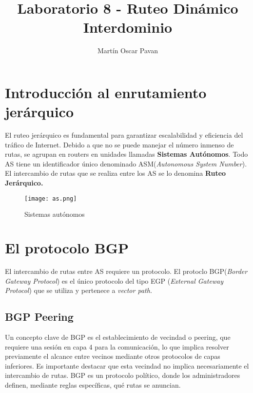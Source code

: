 \documentclass{article}
\title{Laboratorio 8 - Ruteo Dinámico Interdominio}
\author{Martín Oscar Pavan}
\begin{document}
\maketitle
\section{Introducción al enrutamiento jerárquico}
El ruteo jerárquico es fundamental para garantizar escalabilidad y eficiencia del tráfico de Internet. Debido a que no se puede manejar el número inmenso de rutas, se agrupan en routers en unidades llamadas \textbf{Sistemas Autónomos}. Todo AS tiene un identificador único denominado ASM(\textit{Autonomous System Number}). 
El intercambio de rutas que se realiza entre los AS se lo denomina \textbf{Ruteo Jerárquico.}


\begin{figure}[H]
    \centering
    \texttt{[image: as.png]}
    \caption{Sistemas autónomos}
    \label{fig:enter-label}
\end{figure}

\section{El protocolo BGP}
El intercambio de rutas entre AS requiere un protocolo. El protoclo BGP(\textit{Border Gateway Protocol}) es el único protocolo del tipo EGP (\textit{External Gateway Protocol}) que se utiliza y pertenece a \textit{vector path.}

\subsection{BGP Peering}
Un concepto clave de BGP es el establecimiento de vecindad o peering, que requiere una sesión en capa 4 para la comunicación, lo que implica resolver previamente el alcance entre vecinos mediante otros protocolos de capas inferiores. Es importante destacar que esta vecindad no implica necesariamente el intercambio de rutas. BGP es un protocolo político, donde los administradores definen, mediante reglas específicas, qué rutas se anuncian.
\end{document}
